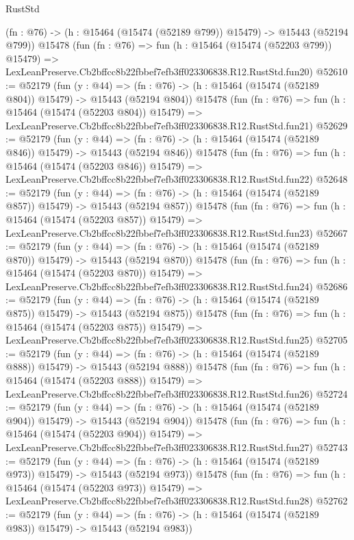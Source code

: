 \begin{lexlean}{RustStd}
\begin{coremodule}
    (fn : @76) -> (h : @15464 (@15474 (@52189 @799)) @15479) -> @15443 (@52194 @799))
    @15478
    (fun (fn : @76) =>
    fun (h : @15464 (@15474 (@52203 @799)) @15479) =>
    LexLeanPreserve.Cb2bffcc8b22fbbef7efb3ff023306838.R12.RustStd.fun20)
@52610 := @52179
    (fun (y : @44) =>
    (fn : @76) -> (h : @15464 (@15474 (@52189 @804)) @15479) -> @15443 (@52194 @804))
    @15478
    (fun (fn : @76) =>
    fun (h : @15464 (@15474 (@52203 @804)) @15479) =>
    LexLeanPreserve.Cb2bffcc8b22fbbef7efb3ff023306838.R12.RustStd.fun21)
@52629 := @52179
    (fun (y : @44) =>
    (fn : @76) -> (h : @15464 (@15474 (@52189 @846)) @15479) -> @15443 (@52194 @846))
    @15478
    (fun (fn : @76) =>
    fun (h : @15464 (@15474 (@52203 @846)) @15479) =>
    LexLeanPreserve.Cb2bffcc8b22fbbef7efb3ff023306838.R12.RustStd.fun22)
@52648 := @52179
    (fun (y : @44) =>
    (fn : @76) -> (h : @15464 (@15474 (@52189 @857)) @15479) -> @15443 (@52194 @857))
    @15478
    (fun (fn : @76) =>
    fun (h : @15464 (@15474 (@52203 @857)) @15479) =>
    LexLeanPreserve.Cb2bffcc8b22fbbef7efb3ff023306838.R12.RustStd.fun23)
@52667 := @52179
    (fun (y : @44) =>
    (fn : @76) -> (h : @15464 (@15474 (@52189 @870)) @15479) -> @15443 (@52194 @870))
    @15478
    (fun (fn : @76) =>
    fun (h : @15464 (@15474 (@52203 @870)) @15479) =>
    LexLeanPreserve.Cb2bffcc8b22fbbef7efb3ff023306838.R12.RustStd.fun24)
@52686 := @52179
    (fun (y : @44) =>
    (fn : @76) -> (h : @15464 (@15474 (@52189 @875)) @15479) -> @15443 (@52194 @875))
    @15478
    (fun (fn : @76) =>
    fun (h : @15464 (@15474 (@52203 @875)) @15479) =>
    LexLeanPreserve.Cb2bffcc8b22fbbef7efb3ff023306838.R12.RustStd.fun25)
@52705 := @52179
    (fun (y : @44) =>
    (fn : @76) -> (h : @15464 (@15474 (@52189 @888)) @15479) -> @15443 (@52194 @888))
    @15478
    (fun (fn : @76) =>
    fun (h : @15464 (@15474 (@52203 @888)) @15479) =>
    LexLeanPreserve.Cb2bffcc8b22fbbef7efb3ff023306838.R12.RustStd.fun26)
@52724 := @52179
    (fun (y : @44) =>
    (fn : @76) -> (h : @15464 (@15474 (@52189 @904)) @15479) -> @15443 (@52194 @904))
    @15478
    (fun (fn : @76) =>
    fun (h : @15464 (@15474 (@52203 @904)) @15479) =>
    LexLeanPreserve.Cb2bffcc8b22fbbef7efb3ff023306838.R12.RustStd.fun27)
@52743 := @52179
    (fun (y : @44) =>
    (fn : @76) -> (h : @15464 (@15474 (@52189 @973)) @15479) -> @15443 (@52194 @973))
    @15478
    (fun (fn : @76) =>
    fun (h : @15464 (@15474 (@52203 @973)) @15479) =>
    LexLeanPreserve.Cb2bffcc8b22fbbef7efb3ff023306838.R12.RustStd.fun28)
@52762 := @52179
    (fun (y : @44) =>
    (fn : @76) -> (h : @15464 (@15474 (@52189 @983)) @15479) -> @15443 (@52194 @983))

\end{coremodule}
\end{lexlean}
